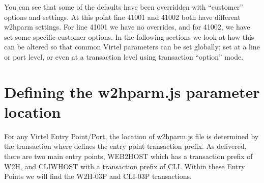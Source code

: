 \documentclass[letterpaper,10pt,english]{sphinxmanual}
\begin{document}
\begin{sphinxVerbatim}[commandchars=\\\{\}]
        
       
    \PYG{p}{[}\PYG{p}{]}
\end{sphinxVerbatim}

You can see that some of the defaults have been overridden with “customer” options and settings. At this point line 41001 and 41002 both have different w2hparm settings. For line 41001 we have no overrides, and for 41002, we have set some specific customer options. In the following sections we look at how this can be altered so that common Virtel parameters can be set globally; set at a line or port level, or even at a transaction level using transaction “option” mode.


\section{Defining the w2hparm.js parameter location}
\label{\detokenize{TN202002:defining-the-w2hparm-js-parameter-location}}
For any Virtel Entry Point/Port, the location of w2hparm.js file is determined by the transaction  where  defines the entry point transaction prefix. As delivered, there are two main entry points, WEB2HOST which has a transaction prefix of W2H, and CLIWHOST with a transaction prefix of CLI. Within these Entry Points we will find the W2H-03P and CLI-03P transactions.

\end{document}
